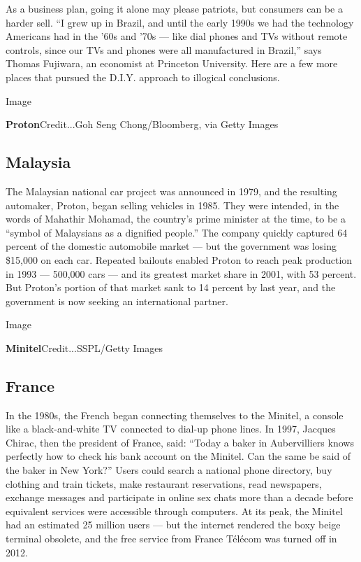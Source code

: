 As a business plan, going it alone may please patriots, but consumers
can be a harder sell. ``I grew up in Brazil, and until the early 1990s
we had the technology Americans had in the '60s and '70s --- like dial
phones and TVs without remote controls, since our TVs and phones were
all manufactured in Brazil,'' says Thomas Fujiwara, an economist at
Princeton University. Here are a few more places that pursued the D.I.Y.
approach to illogical conclusions.

Image

\textbf{Proton}Credit...Goh Seng Chong/Bloomberg, via Getty Images

\hypertarget{malaysia}{%
\subsection{\texorpdfstring{\textbf{Malaysia}}{Malaysia}}\label{malaysia}}

The Malaysian national car project was announced in 1979, and the
resulting automaker, Proton, began selling vehicles in 1985. They were
intended, in the words of Mahathir Mohamad, the country's prime minister
at the time, to be a ``symbol of Malaysians as a dignified people.'' The
company quickly captured 64 percent of the domestic automobile market
--- but the government was losing \$15,000 on each car. Repeated
bailouts enabled Proton to reach peak production in 1993 --- 500,000
cars --- and its greatest market share in 2001, with 53 percent. But
Proton's portion of that market sank to 14 percent by last year, and the
government is now seeking an international partner.

Image

\textbf{Minitel}Credit...SSPL/Getty Images

\hypertarget{france}{%
\subsection{\texorpdfstring{\textbf{France}}{France}}\label{france}}

In the 1980s, the French began connecting themselves to the Minitel, a
console like a black-and-white TV connected to dial-up phone lines. In
1997, Jacques Chirac, then the president of France, said: ``Today a
baker in Aubervilliers knows perfectly how to check his bank account on
the Minitel. Can the same be said of the baker in New York?'' Users
could search a national phone directory, buy clothing and train tickets,
make restaurant reservations, read newspapers, exchange messages and
participate in online sex chats more than a decade before equivalent
services were accessible through computers. At its peak, the Minitel had
an estimated 25 million users --- but the internet rendered the boxy
beige terminal obsolete, and the free service from France Télécom was
turned off in 2012.

